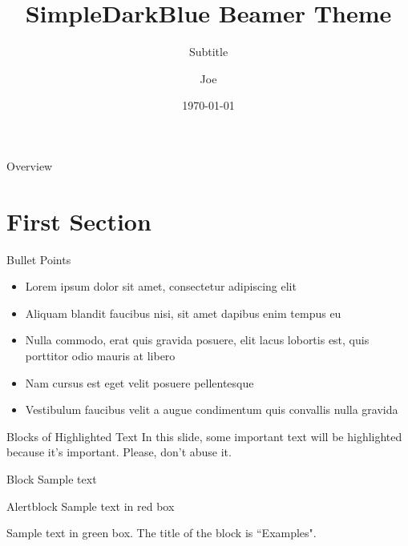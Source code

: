 \documentclass[aspectratio=169,xcolor=dvipsnames]{beamer}
\title{SimpleDarkBlue Beamer Theme}
\subtitle{Subtitle}
\author{Joe}
\institute
{
    Department of Statistics: UC Davis %
}
\date{\today} %
\begin{document}
\begin{frame}
    \titlepage
\end{frame}

\begin{frame}{Overview}
    \tableofcontents
\end{frame}

\section{First Section}

\begin{frame}{Bullet Points}
    \begin{itemize}
        \item Lorem ipsum dolor sit amet, consectetur adipiscing elit
        \item Aliquam blandit faucibus nisi, sit amet dapibus enim tempus eu
        \item Nulla commodo, erat quis gravida posuere, elit lacus lobortis est, quis porttitor odio mauris at libero
        \item Nam cursus est eget velit posuere pellentesque
        \item Vestibulum faucibus velit a augue condimentum quis convallis nulla gravida
    \end{itemize}
\end{frame}


\begin{frame}{Blocks of Highlighted Text}
    In this slide, some important text will be \alert{highlighted} because it's important. Please, don't abuse it.

    \begin{block}{Block}
        Sample text
    \end{block}

    \begin{alertblock}{Alertblock}
        Sample text in red box
    \end{alertblock}

    \begin{examples}
        Sample text in green box. The title of the block is ``Examples".
    \end{examples}
\end{frame}
\end{document}
